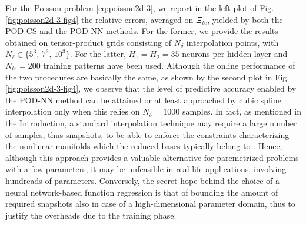 \documentclass[12pt, a4paper, twoside, openright, notitlepage]{report}
\numberwithin{equation}{chapter}
\theoremstyle{theorem}
\theoremstyle{definition}
\theoremstyle{remark}
\theoremstyle{proposition}
\numberwithin{figure}{chapter}
\begin{document}
		For the Poisson problem \eqref{eq:poisson2d-3}, we report in the left plot of Fig. \ref{fig:poisson2d-3-fig4} the relative errors, averaged on $\Xi_{te}$, yielded by both the POD-CS and the POD-NN methods. For the former, we provide the results obtained on tensor-product grids consisting of $N_{\delta}$ interpolation points, with $N_{\delta} \in \lbrace 5^3, \, 7^3, \, 10^3 \rbrace$. For the latter, $H_1 = H_2 = 35$ neurons per hidden layer and $N_{tr} = 200$ training patterns have been used. Although the online performance of the two procedures are basically the same, as shown by the second plot in Fig. \ref{fig:poisson2d-3-fig4}, we observe that the level of predictive accuracy enabled by the POD-NN method can be attained or at least approached by cubic spline interpolation only when this relies on $N_{\delta} = 1000$ samples. In fact, as mentioned in the Introduction, a standard interpolation technique may require a large number of samples, thus snapshots, to be able to enforce the constraints characterizing the nonlinear manifolds which the reduced bases typically belong to \cite{Ams10}. Hence, although this approach provides a valuable alternative for paremetrized problems with a few parameters, it may be unfeasible in real-life applications, involving hundreads of parameters. Conversely, the secret hope behind the choice of a neural network-based function regression is that of bounding the amount of required snapshots also in case of a high-dimensional parameter domain, thus to justify the overheads due to the training phase.
		
\end{document}
